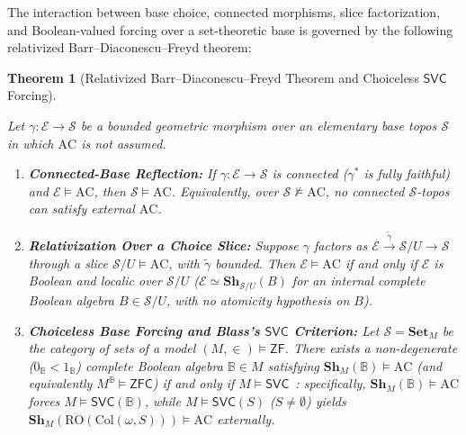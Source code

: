 \documentclass[10pt,twoside,openright]{book}
\theoremstyle{crmplain}
\newtheorem{theorem}{Theorem}[section]
\theoremstyle{crmdef}
\theoremstyle{crmremark}
\begin{document}
The interaction between base choice, connected morphisms, slice factorization, and Boolean-valued forcing over a set-theoretic base is governed by the following relativized Barr--Diaconescu--Freyd theorem:

\begin{theorem}[Relativized Barr--Diaconescu--Freyd Theorem and Choiceless $\mathsf{SVC}$ Forcing]\label{thm:bdf-deformed}%
%

Let $\gamma: \mathcal{E} \to \mathcal{S}$ be a bounded geometric morphism over an elementary base topos $\mathcal{S}$ in which $\mathrm{AC}$ is not assumed.

\begin{enumerate}[label=\textup{(\alph*)},leftmargin=2.0em]

  \item \textbf{Connected-Base Reflection:} If $\gamma : \mathcal{E} \to \mathcal{S}$ is connected ($\gamma^*$ is fully faithful) and $\mathcal{E} \models \mathrm{AC}$, then $\mathcal{S} \models \mathrm{AC}$. Equivalently, over $\mathcal{S} \not\models \mathrm{AC}$, no connected $\mathcal{S}$-topos can satisfy external $\mathrm{AC}$.

  \item \textbf{Relativization Over a Choice Slice:} Suppose $\gamma$ factors as $\mathcal{E} \xrightarrow{\tilde{\gamma}} \mathcal{S}/U \to \mathcal{S}$ through a slice $\mathcal{S}/U \models \mathrm{AC}$, with $\tilde{\gamma}$ bounded. Then $\mathcal{E} \models \mathrm{AC}$ if and only if $\mathcal{E}$ is Boolean and localic over $\mathcal{S}/U$ ($\mathcal{E} \simeq \mathbf{Sh}_{\mathcal{S}/U}(B)$ for an internal complete Boolean algebra $B \in \mathcal{S}/U$, with no atomicity hypothesis on $B$).

  \item \textbf{Choiceless Base Forcing and Blass's $\mathsf{SVC}$ Criterion:} Let $\mathcal{S} = \mathbf{Set}_M$ be the category of sets of a model $(M, \in) \models \mathsf{ZF}$. There exists a non-degenerate ($0_{\mathbb{B}} < 1_{\mathbb{B}}$) complete Boolean algebra $\mathbb{B} \in M$ satisfying $\mathbf{Sh}_M(\mathbb{B}) \models \mathrm{AC}$ (and equivalently $M^{\mathbb{B}} \models \mathsf{ZFC}$) if and only if $M \models \mathsf{SVC}$~\cite{Blass79,Usuba21}: specifically, $\mathbf{Sh}_M(\mathbb{B}) \models \mathrm{AC}$ forces $M \models \mathsf{SVC}(\mathbb{B})$, while $M \models \mathsf{SVC}(S)$ ($S \neq \emptyset$) yields $\mathbf{Sh}_M(\mathrm{RO}(\mathrm{Col}(\omega, S))) \models \mathrm{AC}$ externally.

\end{enumerate}

\end{theorem}
\end{document}
